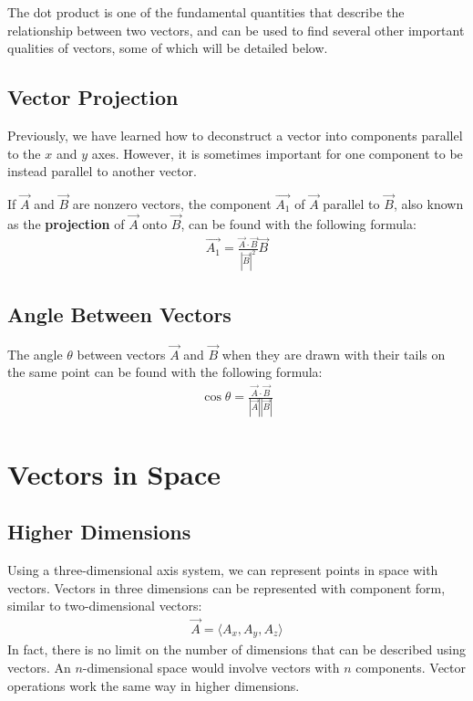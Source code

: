 \documentclass[11pt]{article}
\begin{document}
The dot product is one of the fundamental quantities that describe the relationship between two vectors, and can be used to find several other important qualities of vectors, some of which will be detailed below.

\subsection{Vector Projection}
Previously, we have learned how to deconstruct a vector into components parallel to the $x$ and $y$ axes. However, it is sometimes important for one component to be instead parallel to another vector. 

If \(\Vec{A}\) and \(\Vec{B}\) are nonzero vectors, the component \(\Vec{A_1}\) of \(\Vec{A}\) parallel to \(\Vec{B}\), also known as the \textbf{projection} of \(\Vec{A}\) onto \(\Vec{B}\), can be found with the following formula:
\begin{align*}
    \Vec{A_1} = \frac{\Vec{A} \cdot \Vec{B}}{|\Vec{B}|^2} \Vec{B} 
\end{align*}

\subsection{Angle Between Vectors}
The angle $\theta$ between vectors \(\Vec{A}\) and \(\Vec{B}\) when they are drawn with their tails on the same point can be found with the following formula:
\begin{align*}
    \cos\theta = \frac{\Vec{A} \cdot \Vec{B}}{|\Vec{A}| |\Vec{B}|}
\end{align*}

\section{Vectors in Space}

\subsection{Higher Dimensions}
Using a three-dimensional axis system, we can represent points in space with vectors. Vectors in three dimensions can be represented with component form, similar to two-dimensional vectors: 
\begin{align*}
    \Vec{A} = \langle A_x, A_y, A_z\rangle 
\end{align*}
In fact, there is no limit on the number of dimensions that can be described using vectors. An $n$-dimensional space would involve vectors with $n$  components. Vector operations work the same way in higher dimensions.
\end{document}
